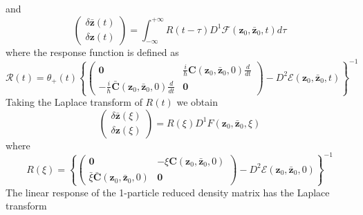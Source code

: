 \documentclass[aps,preprint]{revtex4}
\begin{document}
and 
\begin{equation}
\left( 
\begin{array}{c}
\delta \mathbf{\bar{z}}\left( t\right) \\ 
\delta \mathbf{z}\left( t\right)%
\end{array}%
\right) =\int_{-\infty }^{+\infty }R\left( t-\tau \right) D^{1}\mathcal{F}%
\left( \mathbf{z}_{0},\mathbf{\bar{z}}_{0},t\right) d\tau
\end{equation}%
where the response function is defined as 
\begin{equation}
\mathcal{R}\left( t\right) =\theta _{+}\left( t\right) \left\{ \left( 
\begin{array}{cc}
\mathbf{0} & \frac{i}{\hslash }\mathbf{C}\left( \mathbf{z}_{0},\mathbf{\bar{z%
}}_{0},0\right) \frac{d}{dt} \\ 
-\frac{i}{\hslash }\mathbf{\bar{C}}\left( \mathbf{z}_{0},\mathbf{\bar{z}}%
_{0},0\right) \frac{d}{dt} & \mathbf{0}%
\end{array}%
\right) -D^{2}\mathcal{E}\left( \mathbf{z}_{0},\mathbf{\bar{z}}_{0},t\right)
\right\} ^{-1}
\end{equation}%
Taking the Laplace transform of $R\left( t\right) $ we obtain 
\begin{equation}
\left( 
\begin{array}{c}
\delta \mathbf{\bar{z}}\left( \xi \right) \\ 
\delta \mathbf{z}\left( \xi \right)%
\end{array}%
\right) =R\left( \xi \right) D^{1}F\left( \mathbf{z}_{0},\mathbf{\bar{z}}%
_{0},\xi \right)
\end{equation}%
where 
\begin{equation}
R\left( \xi \right) =\left\{ \left( 
\begin{array}{cc}
\mathbf{0} & -\xi \mathbf{C}\left( \mathbf{z}_{0},\mathbf{\bar{z}}%
_{0},0\right) \\ 
\bar{\xi}\mathbf{\bar{C}}\left( \mathbf{z}_{0},\mathbf{\bar{z}}_{0},0\right)
& \mathbf{0}%
\end{array}%
\right) -D^{2}\mathcal{E}\left( \mathbf{z}_{0},\mathbf{\bar{z}}_{0},0\right)
\right\} ^{-1}
\end{equation}%
The linear response of the 1-particle reduced density matrix has the Laplace
transform 
\end{document}
